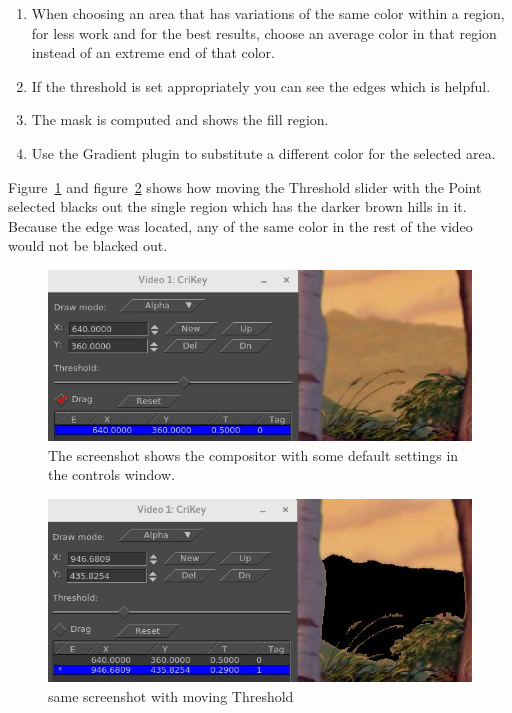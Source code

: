 \begin{enumerate}
    \item When choosing an area that has variations of the same color within a region, for less work and for the best results, choose an average color in that region instead of an extreme end of that color.
    \item If the threshold is set appropriately you can see the edges which is helpful.
    \item The mask is computed and shows the fill region.
    \item Use the Gradient plugin to substitute a different color for the selected area.
\end{enumerate}

Figure~\ref{fig:crikey01} and figure~\ref{fig:crikey02} shows how moving the Threshold slider with the Point selected blacks out the single region which has the darker brown hills in it. Because the edge was located, any of the same color in the rest of the video would not be blacked out.

\begin{figure}[htpb]
    \centering
    \includegraphics[width=0.8\linewidth]{images/crikey01.png}
    \caption{The screenshot shows the compositor with some default settings in the controls window.}
    \label{fig:crikey01}
\end{figure}

\begin{figure}[htpb]
    \centering
    \includegraphics[width=0.8\linewidth]{images/crikey02.png}
    \caption{same screenshot with moving Threshold}
    \label{fig:crikey02}
\end{figure}

